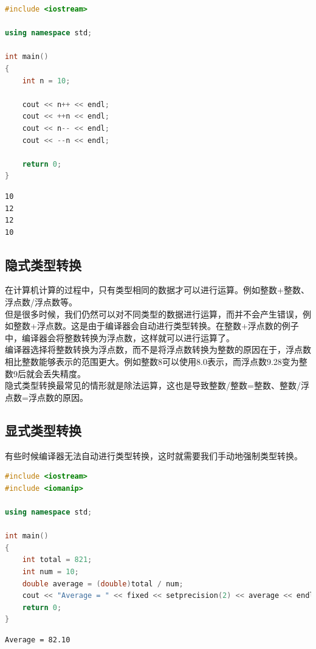 
\begin{lstlisting}[language=C++]
#include <iostream>

using namespace std;

int main()
{
	int n = 10;

	cout << n++ << endl;
	cout << ++n << endl;
	cout << n-- << endl;
	cout << --n << endl;

	return 0;
}
\end{lstlisting}

\begin{tcolorbox}
	\begin{verbatim}
10
12
12
10
	\end{verbatim}
\end{tcolorbox}

\vspace{0.5cm}

\subsection{隐式类型转换}

在计算机计算的过程中，只有类型相同的数据才可以进行运算。例如整数+整数、浮点数/浮点数等。\\

但是很多时候，我们仍然可以对不同类型的数据进行运算，而并不会产生错误，例如整数+浮点数。这是由于编译器会自动进行类型转换。在整数+浮点数的例子中，编译器会将整数转换为浮点数，这样就可以进行运算了。\\

编译器选择将整数转换为浮点数，而不是将浮点数转换为整数的原因在于，浮点数相比整数能够表示的范围更大。例如整数8可以使用8.0表示，而浮点数9.28变为整数9后就会丢失精度。\\

隐式类型转换最常见的情形就是除法运算，这也是导致整数/整数=整数、整数/浮点数=浮点数的原因。\\

\subsection{显式类型转换}

有些时候编译器无法自动进行类型转换，这时就需要我们手动地强制类型转换。\\


\begin{lstlisting}[language=C++]
#include <iostream>
#include <iomanip>

using namespace std;

int main()
{
	int total = 821;
	int num = 10;
	double average = (double)total / num;
	cout << "Average = " << fixed << setprecision(2) << average << endl;
	return 0;
}
\end{lstlisting}

\begin{tcolorbox}
	\begin{verbatim}
Average = 82.10
	\end{verbatim}
\end{tcolorbox}

\newpage